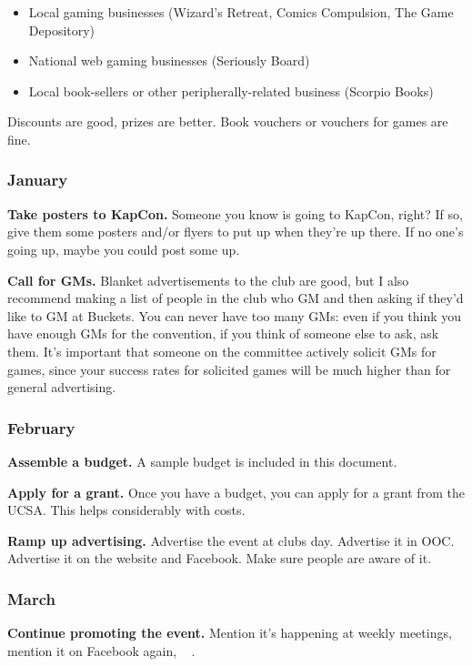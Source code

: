 \begin{itemize}
  \item Local gaming businesses (\eg Wizard's Retreat, Comics Compulsion, The Game Depository)
  \item National web gaming businesses (\eg Seriously Board)
  \item Local book-sellers or other peripherally-related business (\eg Scorpio Books)
\end{itemize}

Discounts are good, prizes are better. Book vouchers or vouchers for games are fine.

\subsubsection{January}

\textbf{Take posters to KapCon.} Someone you know is going to KapCon, right? If so, give them some posters and/or flyers to put up when they're up there. If no one's going up, maybe you could post some up.

\textbf{Call for GMs.} Blanket advertisements to the club are good, but I also recommend making a list of people in the club who GM and then asking if they'd like to GM at Buckets. You can never have too many GMs: even if you think you have enough GMs for the convention, if you think of someone else to ask, ask them. It's important that someone on the committee actively solicit GMs for games, since your success rates for solicited games will be much higher than for general advertising.

\subsubsection{February}

\textbf{Assemble a budget.} A sample budget is included in this document.

\textbf{Apply for a grant.} Once you have a budget, you can apply for a grant from the UCSA. This helps considerably with costs.

\textbf{Ramp up advertising.} Advertise the event at clubs day. Advertise it in OOC. Advertise it on the website and Facebook. Make sure people are aware of it.

\subsubsection{March}

\textbf{Continue promoting the event.} Mention it's happening at weekly meetings, mention it on Facebook again, \etc~ \etc.

